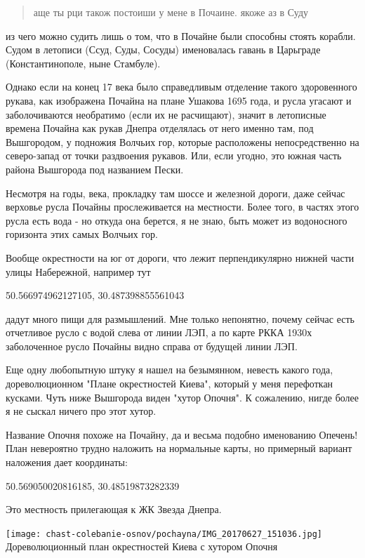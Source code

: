 \begin{quotation}
аще ты рци також постоиши у мене в Почаине. якоже аз в Суду
\end{quotation}

из чего можно судить лишь о том, что в Почайне были способны стоять корабли. Судом в летописи (Ссуд, Суды, Сосуды) именовалась гавань в Царьграде (Константинополе, ныне Стамбуле).

Однако если на конец 17 века было справедливым отделение такого здоровенного рукава, как изображена Почайна на плане Ушакова 1695 года, и русла угасают и заболочиваются необратимо (если их не расчищают), значит в летописные времена Почайна как рукав Днепра отделялась от него именно там, под Вышгородом, у подножия Волчьих гор, которые расположены непосредственно на северо-запад от точки раздвоения рукавов. Или, если угодно, это южная часть района Вышгорода под названием Пески.

Несмотря на годы, века, прокладку там шоссе и железной дороги, даже сейчас верховье русла Почайны прослеживается на местности. Более того, в частях этого русла есть вода - но откуда она берется, я не знаю, быть может из водоносного горизонта этих самых Волчьих гор. 

Вообще окрестности на юг от дороги, что лежит перпендикулярно нижней части улицы Набережной, например тут

50.566974962127105, 30.487398855561043

дадут много пищи для размышлений. Мне только непонятно, почему сейчас есть отчетливое русло с водой слева от линии ЛЭП, а по карте РККА 1930х заболоченное русло Почайны видно справа от будущей линии ЛЭП.

Еще одну любопытную штуку я нашел на безымянном, невесть какого года, дореволюционном "Плане окрестностей Киева", который у меня перефоткан кусками. Чуть ниже Вышгорода виден "хутор Опочня". К сожалению, нигде более я не сыскал ничего про этот хутор.

Название Опочня похоже на Почайну, да и весьма подобно именованию Опечень! План невероятно трудно наложить на нормальные карты, но примерный вариант наложения дает координаты:

50.569050020816185, 30.48519873282339

Это местность прилегающая к ЖК Звезда Днепра. 

\begin{center}
\texttt{[image: chast-colebanie-osnov/pochayna/IMG\_20170627\_151036.jpg]}\\

Дореволюционный план окрестностей Киева с хутором Опочня
\end{center}



